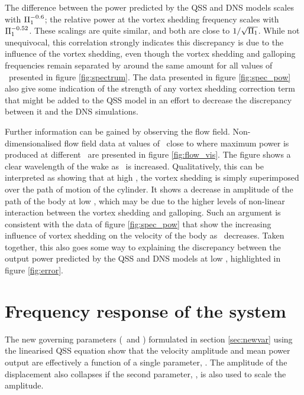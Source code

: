 The difference between the power predicted by the QSS and DNS models scales with $\Pi_1^{-0.6}$; the relative power at the vortex shedding frequency scales with $\Pi_1^{-0.52}$. These scalings are quite similar, and both are close to $1/\sqrt{\Pi_1}$. While not unequivocal, this correlation strongly indicates this discrepancy is due to the influence of the vortex shedding, even though the vortex shedding and galloping frequencies remain separated by around the same amount for all values of \massstiff\ presented in figure \ref{fig:spectrum}. The data presented in figure \ref{fig:spec_pow} also give some indication of the strength of any vortex shedding correction term that might be added to the QSS model in an effort to decrease the discrepancy between it and the DNS simulations.



Further information can be gained by observing the flow field. Non-dimensionalised flow field data at values of \massdamp\ close to where maximum power is produced at different \massstiff\ are presented in figure \ref{fig:flow_vis}. The figure shows a clear wavelength of the wake as \massstiff \ is increased. Qualitatively, this can be interpreted as showing that at high \massstiff, the vortex shedding is simply superimposed over the path of motion of the cylinder. It shows a decrease in amplitude of the path of the body at low \massstiff, which may be due to the higher levels of non-linear interaction between the vortex shedding and galloping. Such an argument is consistent with the data of figure \ref{fig:spec_pow} that show the increasing influence of vortex shedding on the velocity of the body as \massstiff\ decreases. Taken together, this also goes some way to explaining the discrepancy between the output power predicted by the QSS and DNS models at low \massstiff, highlighted in figure \ref{fig:error}.


\section{Frequency response of the system}

The new governing parameters (\massstiff\ and \massdamp) formulated in section \ref{sec:newvar}  using the linearised QSS equation show that the velocity amplitude and mean power output are effectively a function of a single parameter, \massdamp. The amplitude of the displacement also collapses if the second parameter, \massstiff, is also used to scale the amplitude.

